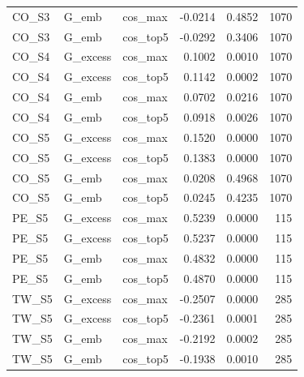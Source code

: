 \begin{tabular}{lllrrr}
CO\_S3 & G\_emb & cos\_max & -0.0214 & 0.4852 & 1070 \\
CO\_S3 & G\_emb & cos\_top5 & -0.0292 & 0.3406 & 1070 \\
CO\_S4 & G\_excess & cos\_max & 0.1002 & 0.0010 & 1070 \\
CO\_S4 & G\_excess & cos\_top5 & 0.1142 & 0.0002 & 1070 \\
CO\_S4 & G\_emb & cos\_max & 0.0702 & 0.0216 & 1070 \\
CO\_S4 & G\_emb & cos\_top5 & 0.0918 & 0.0026 & 1070 \\
CO\_S5 & G\_excess & cos\_max & 0.1520 & 0.0000 & 1070 \\
CO\_S5 & G\_excess & cos\_top5 & 0.1383 & 0.0000 & 1070 \\
CO\_S5 & G\_emb & cos\_max & 0.0208 & 0.4968 & 1070 \\
CO\_S5 & G\_emb & cos\_top5 & 0.0245 & 0.4235 & 1070 \\
PE\_S5 & G\_excess & cos\_max & 0.5239 & 0.0000 & 115 \\
PE\_S5 & G\_excess & cos\_top5 & 0.5237 & 0.0000 & 115 \\
PE\_S5 & G\_emb & cos\_max & 0.4832 & 0.0000 & 115 \\
PE\_S5 & G\_emb & cos\_top5 & 0.4870 & 0.0000 & 115 \\
TW\_S5 & G\_excess & cos\_max & -0.2507 & 0.0000 & 285 \\
TW\_S5 & G\_excess & cos\_top5 & -0.2361 & 0.0001 & 285 \\
TW\_S5 & G\_emb & cos\_max & -0.2192 & 0.0002 & 285 \\
TW\_S5 & G\_emb & cos\_top5 & -0.1938 & 0.0010 & 285 \\
\bottomrule
\end{tabular}
